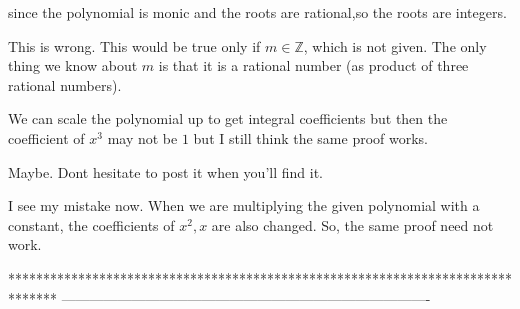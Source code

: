 \begin{solution}
	\begin{tcolorbox}since the polynomial is monic and the roots are rational,so the roots are integers.\end{tcolorbox}
This is wrong.
This would be true only if $m\in\mathbb Z$, which is not given. The only thing we know about $m$ is that it is a rational number (as product of three rational numbers).
\end{solution}






\begin{solution}
	\begin{tcolorbox} We can scale the polynomial up to get integral coefficients but then the coefficient of $x^3$ may not be $1$ but I still think the same proof works.\end{tcolorbox}
Maybe. Dont hesitate to post it when you'll find it.
\end{solution}



\begin{solution}
	I see my mistake now. When we are multiplying the given polynomial with a constant, the coefficients of $x^2, x$ are also changed. So, the same proof need not work.
\end{solution}
*******************************************************************************
-------------------------------------------------------------------------------

